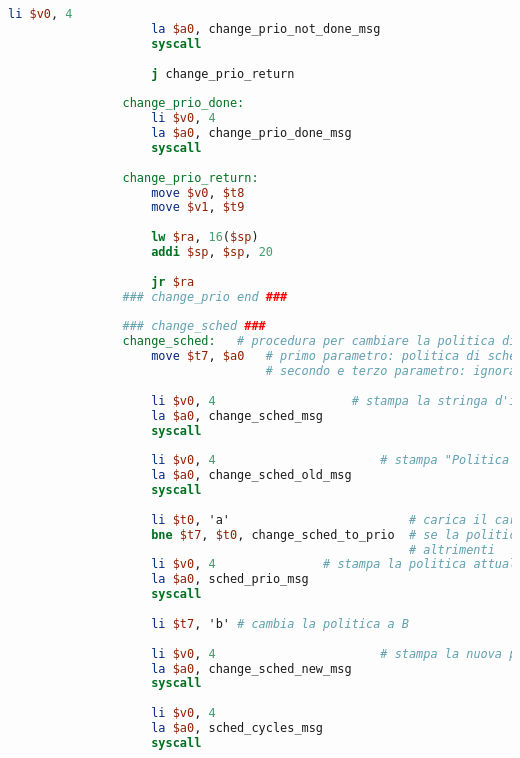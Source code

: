 \begin{center}
\begin{lstlisting}[language=mips, gobble=14, stepnumber=1]
                    li $v0, 4
                    la $a0, change_prio_not_done_msg
                    syscall
                    
                    j change_prio_return
                    
                change_prio_done:
                    li $v0, 4
                    la $a0, change_prio_done_msg
                    syscall
                
                change_prio_return:
                    move $v0, $t8
                    move $v1, $t9
                    
                    lw $ra, 16($sp)
                    addi $sp, $sp, 20
                    
                    jr $ra
                ### change_prio end ###
                
                ### change_sched ###
                change_sched:   # procedura per cambiare la politica di scheduling
                    move $t7, $a0   # primo parametro: politica di scheduling attuale
                                    # secondo e terzo parametro: ignorati
                    
                    li $v0, 4                   # stampa la stringa d'inizio del cambio della politica di scheduling
                    la $a0, change_sched_msg
                    syscall
                    
                    li $v0, 4                       # stampa "Politica di scheduling attuale:"
                    la $a0, change_sched_old_msg
                    syscall
                    
                    li $t0, 'a'                         # carica il carattere 'a'
                    bne $t7, $t0, change_sched_to_prio  # se la politica di scheduling attuale non è A, viene cambiata ad A
                                                        # altrimenti
                    li $v0, 4               # stampa la politica attuale (su PRIORITÀ)
                    la $a0, sched_prio_msg
                    syscall
                    
                    li $t7, 'b' # cambia la politica a B
                    
                    li $v0, 4                       # stampa la nuova politica (su ESECUZIONI RIMANENTI)
                    la $a0, change_sched_new_msg
                    syscall
                    
                    li $v0, 4
                    la $a0, sched_cycles_msg
                    syscall
                    

\end{lstlisting}
\end{center}
